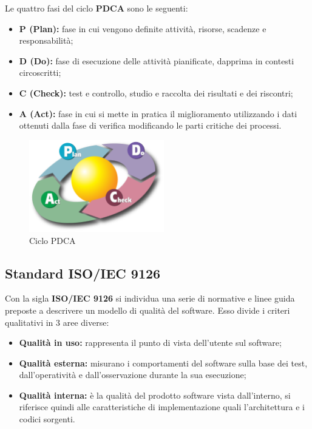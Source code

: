 \begin{flushleft}
Le quattro fasi del ciclo \textbf{PDCA} sono le seguenti:
\begin{itemize}[label={}]
	\item \textbf{P (Plan):} fase in cui vengono definite attività, risorse, scadenze e responsabilità;
	\item \textbf{D (Do):} fase di esecuzione delle attività pianificate, dapprima in contesti circoscritti;
	\item \textbf{C (Check):} test e controllo, studio e raccolta dei risultati e dei riscontri;
	\item \textbf{A (Act):} fase in cui si mette in pratica il miglioramento utilizzando i dati ottenuti dalla fase di verifica modificando le parti critiche dei processi.
\end{itemize}

\begin{figure}[h]
\centering
\includegraphics[height= 4cm] {./img/demcycle.png}
\caption{Ciclo PDCA}
\end{figure}

\subsection{Standard ISO/IEC 9126}

Con la sigla \textbf{ISO/IEC 9126} si individua una serie di normative e linee guida preposte a descrivere un modello di qualità del software.
Esso divide i criteri qualitativi in 3 aree diverse:
\begin{itemize}

	\item \textbf{Qualità in uso:} rappresenta il punto di vista dell'utente sul software;
	\item \textbf{Qualità esterna:} misurano i comportamenti del software sulla base dei test, dall'operatività e dall'osservazione durante la sua esecuzione;
	\item \textbf{Qualità interna:} è la qualità del prodotto software vista dall'interno, si riferisce quindi alle caratteristiche di implementazione quali l'architettura e i codici sorgenti.
\end{itemize}


\end{flushleft}
